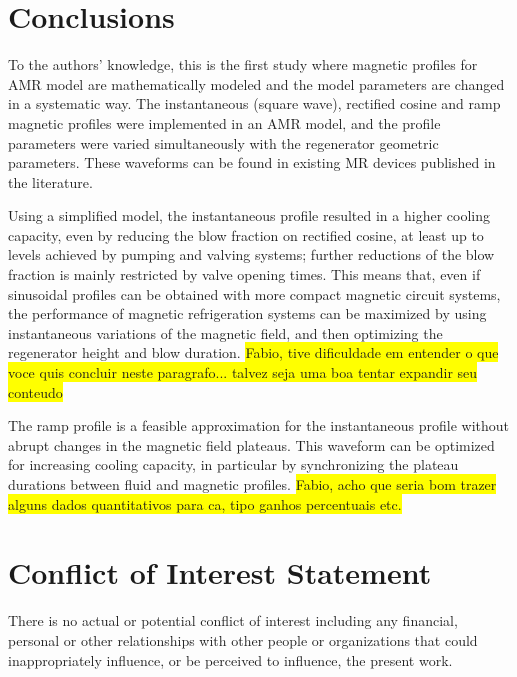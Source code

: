 \documentclass[referee]{svjour3}
\begin{document}
\section{Conclusions}
\label{sec:final-considerations}

To the authors' knowledge, this is the first study where magnetic profiles for AMR model are mathematically modeled and the model parameters are changed in a systematic way. The instantaneous (square wave), rectified cosine and ramp magnetic profiles were implemented in an AMR model, and the profile parameters were varied simultaneously with the regenerator geometric parameters. These waveforms can be found in existing MR devices published in the literature.

Using a simplified model, the instantaneous profile resulted in a higher cooling capacity, even by reducing the blow fraction on rectified cosine, at least up to levels achieved by pumping and valving systems; further reductions of the blow fraction is mainly restricted by valve opening times. This means that, even if sinusoidal profiles can be obtained with more compact magnetic circuit systems, the performance of magnetic refrigeration systems can be maximized by using instantaneous variations of the magnetic field, and then optimizing the regenerator height and blow duration. \colorbox{yellow}{Fabio, tive dificuldade em entender o que voce quis concluir neste paragrafo... talvez seja uma boa tentar expandir seu conteudo}

The ramp profile is a feasible approximation for the instantaneous profile without abrupt changes in the magnetic field plateaus. This waveform can be optimized for increasing cooling capacity, in particular by synchronizing the plateau durations between fluid and magnetic profiles. \colorbox{yellow}{Fabio, acho que seria bom trazer alguns dados quantitativos para ca, tipo ganhos percentuais etc.}

\section*{Conflict of Interest Statement}

There is no actual or potential conflict of interest including any financial, personal or other relationships with other people or organizations that could inappropriately influence, or be perceived to influence, the present work.






\end{document}

